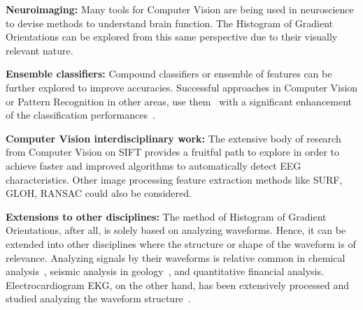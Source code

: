 \textbf{Neuroimaging:}
Many tools for Computer Vision are being used in neuroscience to devise methods to understand brain function.  The Histogram of Gradient Orientations can be explored from this same perspective due to their visually relevant nature.

\textbf{Ensemble classifiers:}
Compound classifiers or ensemble of features can be further explored to improve accuracies.  Successful approaches in Computer Vision or Pattern Recognition in other areas, use them~\cite{Criminisi2013} with a significant enhancement of the classification performances~\cite{Gu2012}.

\textbf{Computer Vision interdisciplinary work:}
The extensive body of research from Computer Vision on SIFT provides a fruitful path to explore in order to achieve faster and improved algorithms to automatically detect EEG characteristics. Other image processing feature extraction methods like SURF, GLOH, RANSAC could also be considered.

\textbf{Extensions to other disciplines:}
The method of Histogram of Gradient Orientations, after all, is solely based on analyzing waveforms. Hence, it can be extended into other disciplines where the structure or shape of the waveform is of relevance.  Analyzing signals by their waveforms is relative common in chemical analysis~\cite{Skoog2000}, seismic analysis in geology~\cite{Owens1984}, and quantitative financial analysis.  Electrocardiogram EKG, on the other hand, has been extensively processed and studied analyzing the waveform structure~\cite{Stockman1976}.



%
